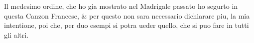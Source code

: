 Il medesimo ordine, che ho gia mostrato nel Madrigale passato ho segurto in questa Canzon Francese, \& per questo non sara necessario dichiarare piu, la mia intentione, poi che, per duo esempi si potra ueder quello, che si puo fare in tutti gli altri.
